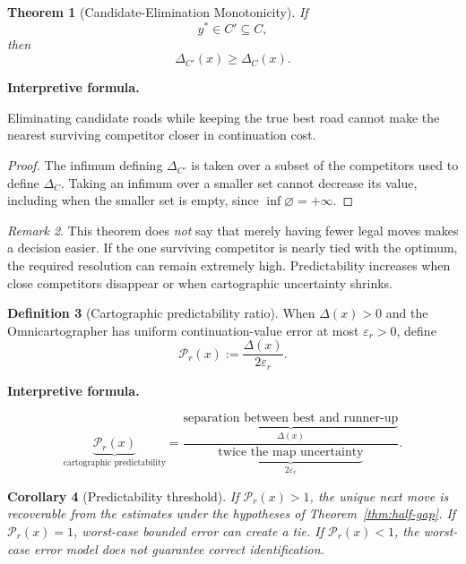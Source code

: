 \documentclass[11pt]{article}
\newtheorem{theorem}{Theorem}[section]
\newtheorem{corollary}[theorem]{Corollary}
\theoremstyle{definition}
\newtheorem{definition}[theorem]{Definition}
\theoremstyle{remark}
\newtheorem{remark}[theorem]{Remark}
\newcommand{\Gap}{\Delta}
\newcommand{\eps}{\varepsilon}
\newenvironment{interpretiveformula}{%
  \begin{center}\begin{minipage}{0.92\linewidth}\small
  \textbf{Interpretive formula.}\ \raggedright}{\end{minipage}\end{center}}
\begin{document}
\begin{theorem}[Candidate-Elimination Monotonicity]
If
\[
y^*\in C'\subseteq C,
\]
then
\[
\boxed{\Gap_{C'}(x)\ge\Gap_C(x)}.
\]
\end{theorem}

\begin{interpretiveformula}
Eliminating candidate roads while keeping the true best road cannot make the nearest surviving competitor closer in continuation cost.
\end{interpretiveformula}

\begin{proof}
The infimum defining $\Gap_{C'}$ is taken over a subset of the competitors used to define $\Gap_C$. Taking an infimum over a smaller set cannot decrease its value, including when the smaller set is empty, since $\inf\varnothing=+\infty$.
\end{proof}

\begin{remark}
This theorem does \emph{not} say that merely having fewer legal moves makes a decision easier. If the one surviving competitor is nearly tied with the optimum, the required resolution can remain extremely high. Predictability increases when close competitors disappear or when cartographic uncertainty shrinks.
\end{remark}

\begin{definition}[Cartographic predictability ratio]
When $\Gap(x)>0$ and the Omnicartographer has uniform continuation-value error at most $\eps_r>0$, define
\[
\mathcal P_r(x):=\frac{\Gap(x)}{2\eps_r}.
\]
\end{definition}

\begin{interpretiveformula}
\[
\underbrace{\mathcal P_r(x)}_{\text{cartographic predictability}}
=
\frac{\underbrace{\text{separation between best and runner-up}}_{\Gap(x)}}{\underbrace{\text{twice the map uncertainty}}_{2\eps_r}}.
\]
\end{interpretiveformula}

\begin{corollary}[Predictability threshold]
If $\mathcal P_r(x)>1$, the unique next move is recoverable from the estimates under the hypotheses of Theorem~\ref{thm:half-gap}. If $\mathcal P_r(x)=1$, worst-case bounded error can create a tie. If $\mathcal P_r(x)<1$, the worst-case error model does not guarantee correct identification.
\end{corollary}
\end{document}
